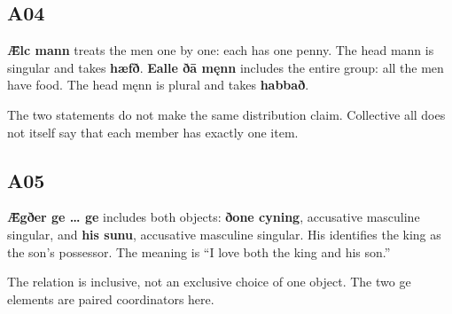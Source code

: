 \subsection*{A04}

\par\begin{minipage}{\linewidth}\raggedright
\textbf{Ǣlc mann} treats the men one by one: each has one penny. The head mann is singular and takes \textbf{hæfð}. \textbf{Ealle ðā męnn} includes the entire group: all the men have food. The head męnn is plural and takes \textbf{habbað}.

The two statements do not make the same distribution claim. Collective all does not itself say that each member has exactly one item.

\end{minipage}\par\addvspace{4pt}

\subsection*{A05}

\par\begin{minipage}{\linewidth}\raggedright
\textbf{Ǣgðer ge … ge} includes both objects: \textbf{ðone cyning}, accusative masculine singular, and \textbf{his sunu}, accusative masculine singular. His identifies the king as the son’s possessor. The meaning is “I love both the king and his son.”

The relation is inclusive, not an exclusive choice of one object. The two ge elements are paired coordinators here.

\end{minipage}\par\addvspace{4pt}

